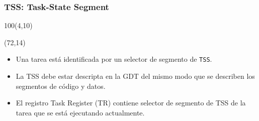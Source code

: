 \documentclass[aspectratio=169]{beamer}
\begin{document}
\begin{frame}
\frametitle{TSS: Task-State Segment}
    \begin{textblock}{100}(4,10)  \end{textblock}  %
    \begin{textblock}{75}(72,14)
        \begin{itemize}
        \item<2->[-] Una tarea est\'a identificada por un selector de segmento de \texttt{TSS}.
        \vspace{0.5cm}
        \item<3->[-] La TSS debe estar descripta en la GDT del mismo modo que se describen los segmentos de c\'odigo y datos.
        \vspace{0.5cm}
        \item<4->[-] El registro Task Register (TR) contiene selector de segmento de TSS de la tarea que se est\'a ejecutando actualmente.
        \end{itemize}
    \end{textblock}
\end{frame}
    
\end{document}

